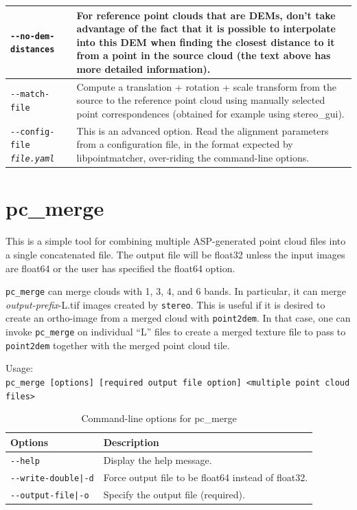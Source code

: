 \begin{longtable}{|p{8cm}|p{9cm}|}
\texttt{-\/-no-dem-distances} & For reference point clouds that are DEMs, don't take advantage of the fact that it is possible to interpolate into this DEM when finding the closest distance to it from a point in the source cloud (the text above has more detailed information). \\ \hline

\texttt{-\/-match-file} & Compute a translation + rotation + scale transform from the source to the reference point cloud using manually selected point correspondences (obtained for example using stereo\_gui). \\ \hline

\texttt{-\/-config-file \textit{file.yaml}} & This is an advanced
option. Read the alignment parameters from a configuration file, in the
format expected by libpointmatcher, over-riding the command-line options.\\ \hline

\end{longtable}




\section{pc\_merge}
\label{pcmerge}

This is a simple tool for combining multiple ASP-generated point cloud files into
a single concatenated file.  The output file will be float32 unless the input images
are float64 or the user has specified the float64 option.

\texttt{pc\_merge} can merge clouds with
1, 3, 4, and 6 bands. In particular, it can merge \textit{output-prefix}-L.tif images
created by \texttt{stereo}. This is useful if it is desired to create an
ortho-image from a merged cloud with \texttt{point2dem}. In that case,
one can invoke \texttt{pc\_merge} on individual ``L'' files to create a
merged texture file to pass to \texttt{point2dem} together with the
merged point cloud tile.


\medskip

Usage:\\
\hspace*{2em}\texttt{pc\_merge [options] [required output file option] <multiple point cloud files>}

\medskip

\begin{longtable}{|l|p{10cm}|}
\caption{Command-line options for pc\_merge}
\label{tbl:pcmerge}
\endfirsthead
\endhead
\endfoot
\endlastfoot
\hline
Options & Description \\ \hline \hline
\texttt{-\/-help} & Display the help message.\\ \hline
\texttt{-\/-write-double|-d} & Force output file to be float64 instead of float32.\\ \hline
\texttt{-\/-output-file|-o} & Specify the output file (required).\\ \hline
\end{longtable}




